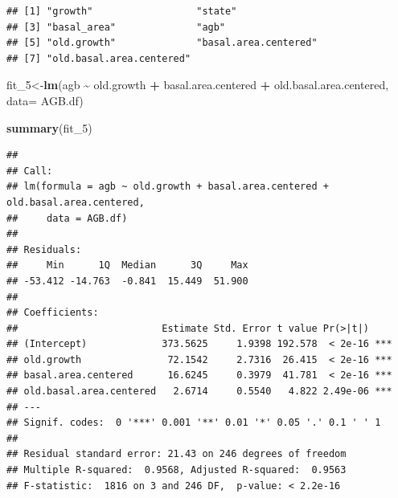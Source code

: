 \documentclass[
]{article}
\newenvironment{Shaded}{\begin{snugshade}}{\end{snugshade}}
\newcommand{\AttributeTok}[1]{\textcolor[rgb]{0.13,0.29,0.53}{#1}}
\newcommand{\FunctionTok}[1]{\textcolor[rgb]{0.13,0.29,0.53}{\textbf{#1}}}
\newcommand{\NormalTok}[1]{#1}
\newcommand{\OtherTok}[1]{\textcolor[rgb]{0.56,0.35,0.01}{#1}}
\newcommand{\SpecialCharTok}[1]{\textcolor[rgb]{0.81,0.36,0.00}{\textbf{#1}}}
\begin{document}
\begin{verbatim}
## [1] "growth"                  "state"                  
## [3] "basal_area"              "agb"                    
## [5] "old.growth"              "basal.area.centered"    
## [7] "old.basal.area.centered"
\end{verbatim}

\begin{Shaded}
\begin{Highlighting}[]
\NormalTok{fit\_5}\OtherTok{\textless{}{-}}\FunctionTok{lm}\NormalTok{(agb }\SpecialCharTok{\textasciitilde{}}\NormalTok{ old.growth }\SpecialCharTok{+}\NormalTok{ basal.area.centered }\SpecialCharTok{+}\NormalTok{ old.basal.area.centered, }\AttributeTok{data=}\NormalTok{ AGB.df)}

\FunctionTok{summary}\NormalTok{(fit\_5)}
\end{Highlighting}
\end{Shaded}

\begin{verbatim}
## 
## Call:
## lm(formula = agb ~ old.growth + basal.area.centered + old.basal.area.centered, 
##     data = AGB.df)
## 
## Residuals:
##     Min      1Q  Median      3Q     Max 
## -53.412 -14.763  -0.841  15.449  51.900 
## 
## Coefficients:
##                         Estimate Std. Error t value Pr(>|t|)    
## (Intercept)             373.5625     1.9398 192.578  < 2e-16 ***
## old.growth               72.1542     2.7316  26.415  < 2e-16 ***
## basal.area.centered      16.6245     0.3979  41.781  < 2e-16 ***
## old.basal.area.centered   2.6714     0.5540   4.822 2.49e-06 ***
## ---
## Signif. codes:  0 '***' 0.001 '**' 0.01 '*' 0.05 '.' 0.1 ' ' 1
## 
## Residual standard error: 21.43 on 246 degrees of freedom
## Multiple R-squared:  0.9568, Adjusted R-squared:  0.9563 
## F-statistic:  1816 on 3 and 246 DF,  p-value: < 2.2e-16
\end{verbatim}
\end{document}
